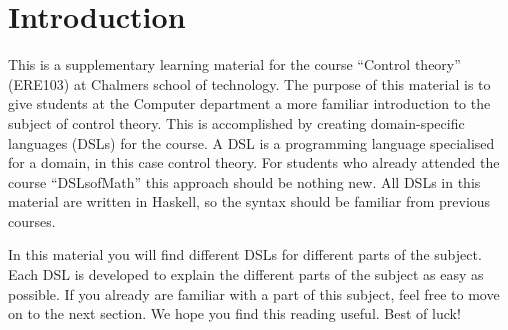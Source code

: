\section{Introduction}

This is a supplementary learning material for the course ``Control theory'' (ERE103) at Chalmers school of technology. The purpose of this material is to give students at the Computer department a more familiar introduction to the subject of control theory. This is accomplished by creating domain-specific languages (DSLs) for the course. A DSL is a programming language specialised for a domain, in this case control theory. For students who already attended the course ``DSLsofMath'' this approach should be nothing new.  All DSLs in this material are written in Haskell, so the syntax should be familiar from previous courses.


In this material you will find different DSLs for different parts of the subject. Each DSL is developed to explain the different parts of the subject as easy as possible. If you already are familiar with a part of this subject, feel free to move on to the next section.
We hope you find this reading useful. Best of luck!


